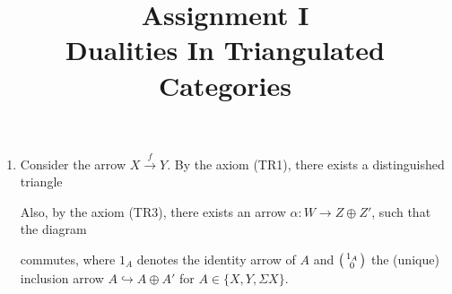 \documentclass[a4paper,11pt]{article}
\title{\Huge\textsf{Assignment I}\\
 \Large\textsf{Dualities In Triangulated Categories}
 \author{}
 \date{}
}
\begin{document}
\maketitle
\thispagestyle{fancy}

\begin{enumerate}[label=(\arabic*)]
 \item Consider the arrow $X \overset{f}{\longrightarrow} Y$. By the axiom
  (TR1), there exists a distinguished triangle
 \begin{center}
 \end{center}
 Also, by the axiom (TR3), there exists an arrow $\alpha:W \to Z \oplus Z'$,
 such that the diagram
 \begin{center}
 \end{center}
 commutes, where $1_A$ denotes the identity arrow of $A$ and
 $\begin{psmallmatrix} 1_A \\ 0 \end{psmallmatrix}$ the (unique) inclusion
 arrow $A \hookrightarrow A \oplus A'$ for $A \in \{X,Y,\Sigma X\}$.


\end{enumerate}
\end{document}
